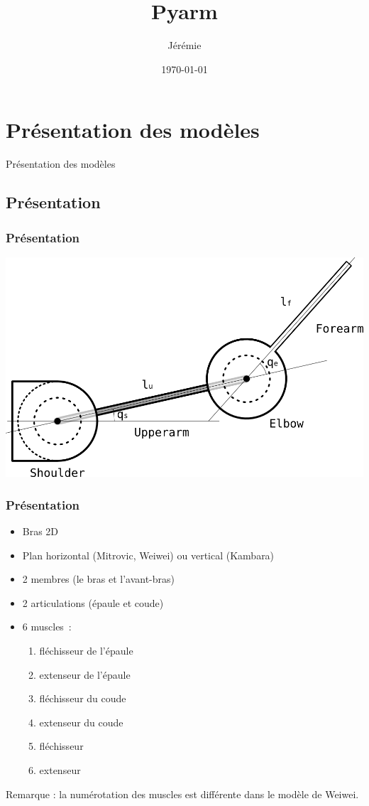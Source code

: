 \documentclass{beamer}
\title{Pyarm}
\author{Jérémie \bsc{Decock}}
\institute{ISIR}
\date{\today{}}
\begin{document}
\begin{frame}
\titlepage
\end{frame}


\section{Présentation des modèles}
\begin{frame}
\begin{center}
{\LARGE Présentation des modèles}
\end{center}
\end{frame}


\subsection{Présentation}

\begin{frame}
\frametitle{Présentation}
\begin{center}
        \includegraphics[width=.40\linewidth]{fig/arm}
\end{center}
\end{frame}

\begin{frame}
\frametitle{Présentation}
\begin{itemize}
    \item Bras 2D
    \item Plan horizontal (Mitrovic, Weiwei) ou vertical (Kambara)
    \item 2 membres (le bras et l'avant-bras) %
    \item 2 articulations (épaule et coude)
    \item 6 muscles~:
    \begin{enumerate}
        \item fléchisseur de l'épaule
        \item extenseur de l'épaule
        \item fléchisseur du coude
        \item extenseur du coude
        \item fléchisseur
        \item extenseur
    \end{enumerate}
\end{itemize}
Remarque : la numérotation des muscles est différente dans le modèle de Weiwei.
\end{frame}
\end{document}
